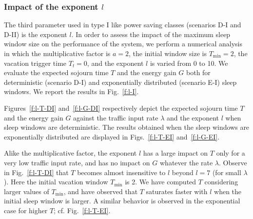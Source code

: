 \documentclass[journal]{IEEEtran}
\begin{document}
\subsubsection{Impact of the exponent $l$} \label{s:l}
The third parameter used in type I like power saving classes
(scenarios D-I and D-II) is the exponent $l$. In order to assess the impact
of the maximum sleep window size on the performance of the system, we
perform a numerical analysis in which the multiplicative factor is
$a=2$, the initial window size is $T_{\min}=2$, the vacation trigger time
$T_t=0$, and the exponent $l$ is
varied from 0 to 10. We evaluate the expected sojourn time $T$ and the
energy gain $G$ both for deterministic (scenario D-I) and exponentially
distributed (scenario E-I) sleep windows. We report the results in
Fig.~\ref{f:l-I}.
\begin{figure*}[tb]
\begin{center}
\caption{Impact of $l$ on $T$ and $G$ with either deterministic or exponential $\{S_i\}_i$.
\label{f:l-I}}
\end{center}
\end{figure*}
Figures~\ref{f:l-T-DI} and~\ref{f:l-G-DI} respectively depict the expected sojourn time $T$ and the energy gain $G$ against the traffic input rate $\lambda$ and the exponent $l$ when sleep windows are
deterministic. The results obtained when the sleep windows are exponentially distributed are displayed in Figs.~\ref{f:l-T-EI} and~\ref{f:l-G-EI}. 

Alike the multiplicative factor, the exponent $l$ has a large impact on $T$ only for a very low traffic input rate, and has no impact on $G$ whatever the rate $\lambda$. Observe in Fig.~\ref{f:l-T-DI} that $T$ becomes almost insensitive to $l$ beyond $l=7$ (for small $\lambda$). Here the initial vacation window $T_{\min}$ is 2. We have computed $T$ considering larger values of $T_{\min}$, and have observed that $T$ saturates faster with $l$ when the initial sleep window is larger. A similar behavior is observed in the exponential case for higher $T$; cf. Fig.~\ref{f:l-T-EI}.
\end{document}
